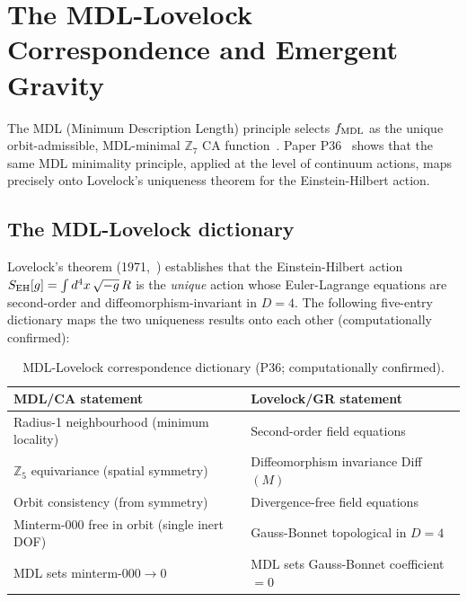 \documentclass[11pt]{article}
\theoremstyle{remark}
\newcommand{\ZS}{\mathbb{Z}_7}
\newcommand{\Zfive}{\mathbb{Z}_5}
\newcommand{\fmdl}{f_{\rm MDL}}
\begin{document}
\section{The MDL-Lovelock Correspondence and Emergent Gravity}
\label{sec:gravity}

The MDL (Minimum Description Length) principle selects $\fmdl$ as the unique
orbit-admissible, MDL-minimal $\ZS$ CA function~\cite{SpivackCompUniversality}.
Paper P36~\cite{SpivackEmergentGravity} shows that the same MDL minimality principle,
applied at the level of continuum actions, maps precisely onto Lovelock's uniqueness
theorem for the Einstein-Hilbert action.

\subsection{The MDL-Lovelock dictionary}
\label{sec:lovelock_dict}

Lovelock's theorem (1971,~\cite{Lovelock1971}) establishes that the Einstein-Hilbert
action $S_{\rm EH}[g] = \int d^4x\,\sqrt{-g}\,R$ is the \emph{unique} action whose
Euler-Lagrange equations are second-order and diffeomorphism-invariant in $D=4$.
The following five-entry dictionary maps the two uniqueness results onto each other
(computationally confirmed):

\begin{table}[H]
\centering
\caption{MDL-Lovelock correspondence dictionary (P36; computationally confirmed).}
\label{tab:mldl_dict}
\small
\renewcommand{\arraystretch}{1.25}
\begin{tabularx}{\linewidth}{@{}XX@{}}
\toprule
\textbf{MDL/CA statement} & \textbf{Lovelock/GR statement} \\
\midrule
Radius-1 neighbourhood (minimum locality) & Second-order field equations \\
$\Zfive$ equivariance (spatial symmetry) & Diffeomorphism invariance Diff$(M)$ \\
Orbit consistency (from symmetry) & Divergence-free field equations \\
Minterm-000 free in orbit (single inert DOF) & Gauss-Bonnet topological in $D=4$ \\
MDL sets minterm-$000 \to 0$ & MDL sets Gauss-Bonnet coefficient $= 0$ \\
\bottomrule
\end{tabularx}
\end{table}
\end{document}
